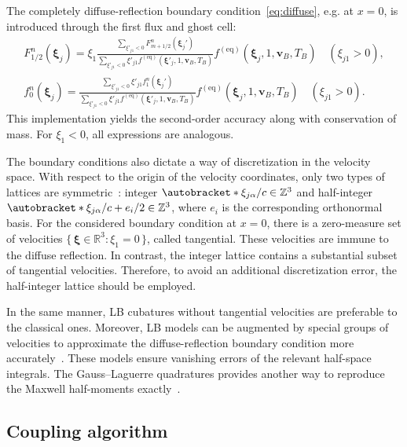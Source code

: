 \documentclass[]{elsarticle} %
\newcommand{\Set}[2]{\{\,{#1}:{#2}\,\}}
\DeclarePairedDelimiter\autobracket()       %
\newcommand{\br}[1]{\autobracket*{#1}}
\newcommand{\bxi}{\boldsymbol{\xi}}
\newcommand{\bv}{\boldsymbol{v}}
\newcommand{\xiai}{\xi_{j \alpha}}
\newcommand{\equil}[1]{#1^\mathrm{(eq)}}
\begin{document}
The completely diffuse-reflection boundary condition~\eqref{eq:diffuse}, e.g. at \(x=0\),
is introduced through the first flux and ghost cell:
\begin{gather}
    F_{1/2}^n(\bxi_j) = \displaystyle\xi_1\frac{\sum_{\xi'_{j1}<0}F_{m+1/2}^n(\bxi_j')}
        {\sum_{\xi'_{j1}<0}\xi'_{j1}\equil{f}(\bxi'_j,1,\bv_B,T_B)}
        \equil{f}(\bxi_j, 1, \bv_B, T_B) \quad (\xi_{j1}>0), \label{eq:first_flux}\\
    f_0^n(\bxi_j) = \displaystyle\frac{\sum_{\xi'_{j1}<0}\xi'_{j1}f_1^n(\bxi_j')}
        {\sum_{\xi'_{j1}<0}\xi'_{j1}\equil{f}(\bxi'_j,1,\bv_B,T_B)}
        \equil{f}(\bxi_j, 1, \bv_B, T_B) \quad (\xi_{j1}>0). \label{eq:first_ghost}
\end{gather}
This implementation yields the second-order accuracy along with conservation of mass.
For \(\xi_1<0\), all expressions are analogous.

The boundary conditions also dictate a way of discretization in the velocity space.
With respect to the origin of the velocity coordinates, only two types of lattices are symmetric~\cite{Inamuro1990}:
integer \(\br{\xiai/c} \in \mathbb{Z}^3\) and half-integer \(\br{\xiai/c + e_i/2} \in \mathbb{Z}^3\),
where \(e_i\) is the corresponding orthonormal basis.
For the considered boundary condition at \(x=0\), there is a zero-measure set of velocities
\(\Set{\bxi\in\mathbb{R}^3}{\xi_1=0}\), called tangential.
These velocities are immune to the diffuse reflection.
In contrast, the integer lattice contains a substantial subset of tangential velocities.
Therefore, to avoid an additional discretization error, the half-integer lattice should be employed.

In the same manner, LB cubatures without tangential velocities are preferable to the classical ones.
Moreover, LB models can be augmented by special groups of velocities to approximate
the diffuse-reflection boundary condition more accurately~\cite{Feuchter2016}.
These models ensure vanishing errors of the relevant half-space integrals.
The Gauss--Laguerre quadratures provides another way to reproduce the Maxwell half-moments exactly~\cite{Ambrus2014, Ambrus2016}.

\subsection{Coupling algorithm}\label{sec:numerics:coupling}

\end{document}
